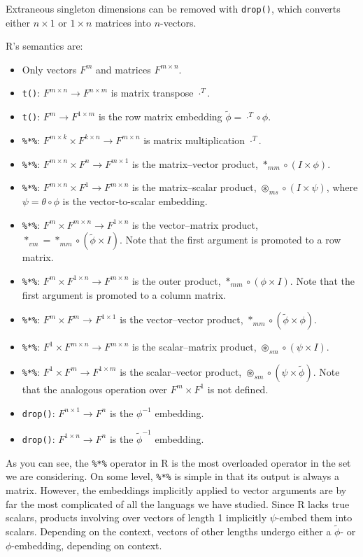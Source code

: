 Extraneous singleton dimensions can be removed with \verb`drop()`,
which converts either $n\times1$ or $1\times n$ matrices into $n$-vectors.

R's semantics are:
\begin{itemize}
\item Only vectors $F^{m}$ and matrices $F^{m\times n}$.
\item \verb`t()`: $F^{m\times n}\rightarrow F^{n\times m}$ is matrix transpose
$\cdot^{T}$.
\item \verb`t()`: $F^{m}\rightarrow F^{1\times m}$ is the row matrix embedding
$\tilde{\phi}=\cdot^{T}\circ\phi$.
\item \verb`%*%`: $F^{m\times k}\times F^{k\times n}\rightarrow F^{m\times n}$
is matrix multiplication $\cdot^{T}$.
\item \verb`%*%`: $F^{m\times n}\times F^{n}\rightarrow F^{m\times1}$
is the matrix–vector product, $*_{mm}\circ\left(I\times\phi\right)$.
\item \verb`%*%`: $F^{m\times n}\times F^{1}\rightarrow F^{m\times n}$
is the matrix–scalar product, $\circledast_{ms}\circ\left(I\times\psi\right)$,
where $\psi=\theta\circ\phi$ is the vector-to-scalar embedding.
\item \verb`%*%`: $F^{m}\times F^{m\times n}\rightarrow F^{1\times n}$
is the vector–matrix product, $*_{vm}=*_{mm}\circ\left(\tilde{\phi}\times I\right)$.
Note that the first argument is promoted to a row matrix.
\item \verb`%*%`: $F^{m}\times F^{1\times n}\rightarrow F^{m\times n}$
is the outer product, $*_{mm}\circ\left(\phi\times I\right)$. Note
that the first argument is promoted to a column matrix.
\item \verb`%*%`: $F^{m}\times F^{m}\rightarrow F^{1\times1}$ is the vector–vector
product, $*_{mm}\circ\left(\tilde{\phi}\times\phi\right)$.
\item \verb`%*%`: $F^{1}\times F^{m\times n}\rightarrow F^{m\times n}$
is the scalar–matrix product, $\circledast_{sm}\circ\left(\psi\times I\right)$.
\item \verb`%*%`: $F^{1}\times F^{m}\rightarrow F^{1\times m}$ is the
scalar–vector product, $\circledast_{sm}\circ\left(\psi\times\tilde{\phi}\right)$.
Note that the analogous operation over $F^{m}\times F^{1}$ is not
defined.
\item \verb`drop()`: $F^{n\times1}\rightarrow F^{n}$ is the $\phi^{-1}$
embedding.
\item \verb`drop()`: $F^{1\times n}\rightarrow F^{n}$ is the $\tilde{\phi}^{-1}$
embedding.
\end{itemize}
As you can see, the \verb`%*%` operator in R is the most overloaded
operator in the set we are considering. On some level, \verb`%*%`
is simple in that its output is always a matrix. However, the embeddings
implicitly applied to vector arguments are by far the most complicated
of all the languags we have studied. Since R lacks true scalars, products
involving over vectors of length 1 implicitly $\psi$-embed them into
scalars. Depending on the context, vectors of other lengths undergo
either a $\tilde{\phi}$- or $\phi$-embedding, depending on context.

